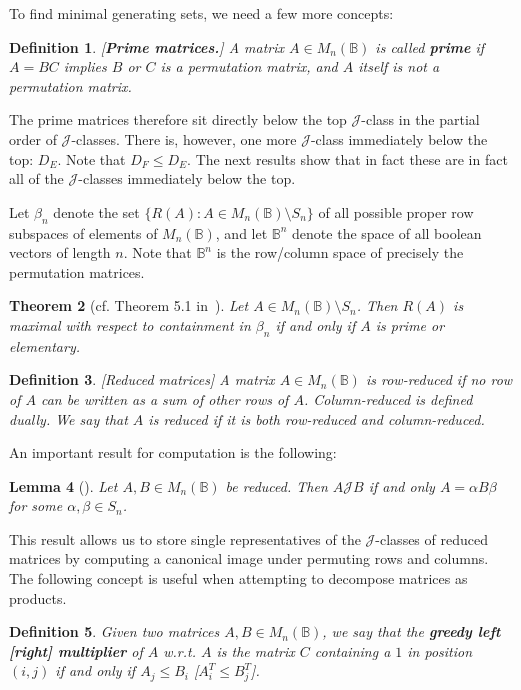 \documentclass[11pt]{article}
\newtheorem{thm}{Theorem}[section]
\newtheorem{lemma}[thm]{Lemma}
\newtheorem{defi}[thm]{Definition}
\newenvironment{de}{\begin{defi}\rm}{\end{defi}}
\newcommand{\defn}[1]{\textbf{\textit{#1}}}
\numberwithin{equation}{section}
\newcommand{\set}[2]{\ensuremath{\{#1 : #2 \}}}
\newcommand{\B}{\mathbb{B}}
\newcommand{\Bn}{M_n(\B)}
\newcommand{\J}{\mathscr{J}}
\begin{document}
To find minimal generating sets, we need a few more concepts:

\begin{de}[\textbf{Prime matrices.}]
  A matrix $A \in \Bn$ is called \defn{prime} if $A = BC$ implies $B$ or $C$ is
  a permutation matrix, and $A$ itself is not a permutation matrix.
\end{de}

The prime matrices therefore sit directly below the top $\J$-class in the
partial order of $\J$-classes. There is, however, one more $\J$-class
immediately below the top: $D_E$. Note that $D_F \leq D_E$. The next results
show that in fact these are in fact all of the $\J$-classes immediately below
the top.

Let $\beta_n$ denote the set $\set{R(A)}{A\in \Bn\setminus S_n}$ of all
possible proper row subspaces of elements of $\Bn$, and let $\B^n$ denote
the space of all boolean vectors of length $n$. Note that $\B^n$ is the
row/column space of precisely the permutation matrices.

\begin{thm}[cf. Theorem 5.1 in~\cite{Caen1981ab}]
  Let $A \in \Bn\setminus S_n$. Then $R(A)$ is maximal with respect to
  containment in $\beta_n$ if and only if $A$ is prime or elementary.  
\end{thm}

\begin{de}[Reduced matrices]
  A matrix $A \in \Bn$ is \emph{row-reduced} if no row of $A$ can be written as
  a sum of other rows of $A$. \emph{Column-reduced} is defined dually. We say
  that $A$ is \emph{reduced} if it is both row-reduced and column-reduced.
\end{de}

An important result for computation is the following:
\begin{lemma}[\cite{Plemmons1970aa}]
  Let $A, B \in \Bn$ be reduced. Then $A \J B$ if and only $A = \alpha B \beta$
  for some $\alpha, \beta \in S_n$. 
\end{lemma}

This result allows us to store single representatives of the $\J$-classes of
reduced matrices by computing a canonical image under permuting rows and
columns. \\

The following concept is useful when attempting to decompose matrices as
products.
\begin{defi}
  Given two matrices $A, B \in \Bn$, we say that the \textbf{\textit{greedy
  left [right] multiplier}} of $A$ w.r.t. $A$ is the matrix $C$ containing a $1$
  in position $(i, j)$ if and only if $A_j \leq B_i$ [$A^T_i \leq B^T_j$].
\end{defi}
\end{document}
